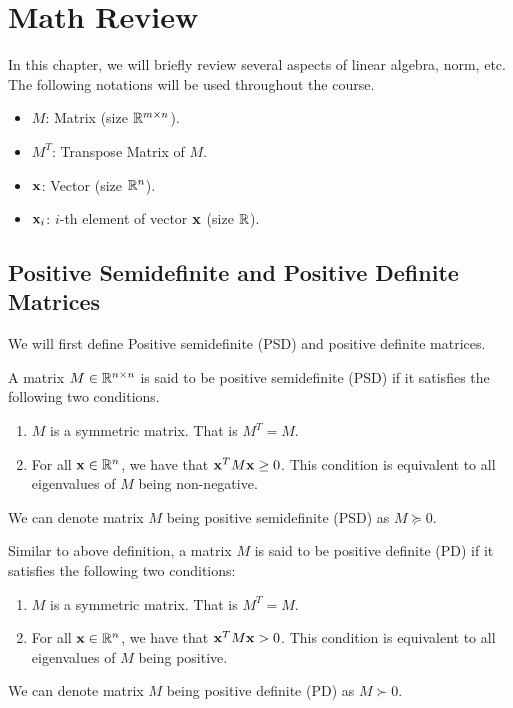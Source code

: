 \documentclass[main.tex]{subfiles}
\begin{document}
\chapter{Math Review}

In this chapter, we will briefly review several aspects of linear algebra, norm, etc. The following notations will be used throughout the course.

\begin{itemize}
	\item $M$: Matrix (size $\mathbb{R}^{m \times n}$).
	\item $M^T$: Transpose Matrix of $M$.
	\item $\mathbf{x}$: Vector (size $\mathbb{R}^n$).
	\item $\mathbf{x}_i$: $i$-th element of vector $\mathbf{x}$ (size $\mathbb{R}$).
\end{itemize}

\section{Positive Semidefinite and Positive Definite Matrices}
We will first define Positive semidefinite (PSD) and positive definite matrices.

\begin{definition}
	
	A matrix $M\in \mathbb{R}^{n\times n}$ is said to be positive semidefinite (PSD) if it satisfies the following two conditions.
	
	\begin{enumerate}
		\item $M$ is a symmetric matrix. That is $M^T = M$.
		\item For all $\mathbf{x} \in \mathbb{R}^n$, we have that $\mathbf{x}^T M \mathbf{x} \geq 0$. This condition is equivalent to all eigenvalues of $M$ being non-negative.
	\end{enumerate}

	We can denote matrix $M$ being positive semidefinite (PSD) as $M \succeq 0$.
\end{definition}

\begin{definition}
	Similar to above definition, a matrix $M$ is said to be positive definite (PD) if it satisfies the following two conditions:
	
	\begin{enumerate}
		\item $M$ is a symmetric matrix. That is $M^T = M$.
		\item For all $\mathbf{x} \in \mathbb{R}^n$, we have that $\mathbf{x}^T M \mathbf{x} > 0$. This condition is equivalent to all eigenvalues of $M$ being positive.
	\end{enumerate}

	We can denote matrix $M$ being positive definite (PD) as $M \succ 0$.
\end{definition}
\end{document}
